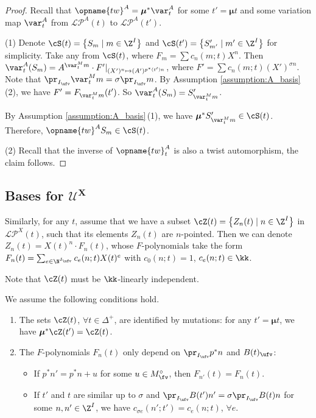 \documentclass[pdftex]{sigma}
\renewcommand{\tw}{\opname{tw}}
\newcommand{\Mc}{M^\circ}
\newcommand{\Iufv}{I_{\ufv}}
\newcommand{\XClAlg}{\mathcal{U}^X}
\newcommand{\LP}{{\mathcal{LP}}}
\newcommand{\seq}{\boldsymbol{\mu}}%
\renewcommand{\tw}{\opname{tw}}
\numberwithin{equation}{section}
\begin{document}
\begin{proof}
Recall that $\tw^{A}=\seq^*\var_{t}^{A}$ for some $t'=\seq t$ and some variation map $\var_{t}^{A}$ from $\LP^A(t)$ to $\LP^A(t')$.

(1) Denote $\cS(t)=\big\{S_m\mid m\in \Z^I\big\}$ and $\cS(t')=\big\{S'_{m'}\mid m'\in \Z^I\big\}$ for simplicity. Take any  from $\cS(t)$, where $F_m =\sum c_n(m;t)X^n$. Then $\smash{\var_{t}^{A}(S_m)=A^{\var_t^M m} }\cdot \smash{F'|_{(X')^n\mapsto (A')^{p^*(t') n}}}$, where $F'=\sum c_{n}(m;t)(X')^{\sigma n}$. Note that $\pr_{\Iufv}\var_t^M m=\sigma \pr_{\Iufv}m$. By Assumption \ref{assumption:A_basis}\,(2), we have $F'=F_{\var_t^M m}(t')$. So $\var_{t}^{A}(S_m)=S'_{\var^M_t m}$.

By Assumption \ref{assumption:A_basis}\,(1), we have $\seq^* S'_{\var^M_t m}\in \cS(t)$. Therefore, $\tw^{A} S_m\in \cS(t)$.

(2) Recall that the inverse of $\tw_{t}^{A}$ is also a twist automorphism,
the claim follows.
\end{proof}

\subsection[Bases for U\^{}X]{Bases for $\boldsymbol{\XClAlg}$}

Similarly, for any $t$, assume that we have a subset $\cZ(t)=\big\{Z_{n}(t)\mid n\in \Z^I\big\}$
in $\LP^{X}(t)$, such that its elements $Z_{n}(t)$ are $n$-pointed.
Then we can denote $Z_{n}(t)=X(t)^{n}\cdot F_{n}(t)$, whose $F$-polynomials
take the form $F_{n}(t)=\sum_{e\in\N^{\Iufv}}c_{e}(n;t)X(t)^{e}$ with
$c_{0}(n;t)=1$, $c_{e}(n;t)\in\kk$.

Note that $\cZ(t)$ must be $\kk$-linearly independent.


\begin{Assumption}\label{assumption:X_basis}
 We assume the following conditions hold.
\begin{enumerate}\itemsep=0pt
\item[(1)] The sets $\cZ(t)$, $\forall t\in\Delta^{+}$, are identified by mutations: for any $t'=\seq t$, we have $\seq^{*}\cZ(t')=\cZ(t)$.
\item[(2)] The $F$-polynomials $F_{n}(t)$ only depend on $\pr_{\Iufv}p^{*}n$
and $B(t)_{\ufv}$:
\begin{itemize}\itemsep=0pt
\item If $p^{*}n'=p^{*}n+u$ for some $u\in\Mc_{\fv}$, then $F_{n'}(t)=F_{n}(t)$.
\item If $t'$ and $t$ are similar up to $\sigma$ and $\pr_{\Iufv}B(t')n'=\sigma\pr_{\Iufv}B(t)n$
for some $n,n'\in\Z^{I}$, we have $c_{\sigma e}(n';t')=c_{e}(n;t)$,
$\forall e$.
\end{itemize}
\end{enumerate}
\end{Assumption}
\end{document}
